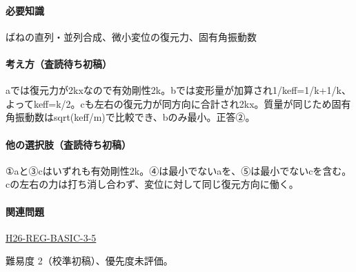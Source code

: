 \paragraph{必要知識} ばねの直列・並列合成、微小変位の復元力、固有角振動数

\paragraph{考え方（査読待ち初稿）} aでは復元力が2kxなので有効剛性2k。bでは変形量が加算され1/keff=\allowbreak{}1/k+1/k、よってkeff=\allowbreak{}k/2。cも左右の復元力が同方向に合計され2kx。質量が同じため固有角振動数はsqrt(keff/m)で比較でき、bのみ最小。正答②。

\paragraph{他の選択肢（査読待ち初稿）} ①aと③cはいずれも有効剛性2k。④は最小でないaを、⑤は最小でないcを含む。cの左右の力は打ち消し合わず、変位に対して同じ復元方向に働く。

\paragraph{関連問題} \hyperref[q:h26-reg-basic-3-5]{H26-REG-BASIC-3-5}

\par 難易度 2（校準初稿）、優先度未評価。
